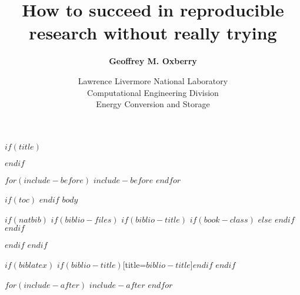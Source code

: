 \documentclass [14pt]{beamer}
\title[Reproducibility without trying]
{How to succeed in reproducible research without really trying}
\subtitle[G. Oxberry]
{\textbf{Geoffrey M. Oxberry}}
\author[]{\small{Lawrence Livermore National Laboratory \\
Computational Engineering Division \\
Energy Conversion and Storage}}
\institute[LLNL-PRES-XXXXX-DRAFT]
\begin{document}
$if(title)$
\maketitle
$endif$ %

$for(include-before)$
$include-before$
$endfor$ %

$if(toc)$
{
\hypersetup{linkcolor=black}
\setcounter{tocdepth}{$toc-depth$}
\tableofcontents
}
$endif$ %
$body$

$if(natbib)$
$if(biblio-files)$
$if(biblio-title)$
$if(book-class)$
\renewcommand\bibname{$biblio-title$}
$else$
\renewcommand\refname{$biblio-title$}
$endif$ %
$endif$ %

$endif$ %
$endif$ %

$if(biblatex)$
\printbibliography$if(biblio-title)$[title=$biblio-title$]$endif$
$endif$ %

$for(include-after)$
$include-after$
$endfor$ %
\end{document}
